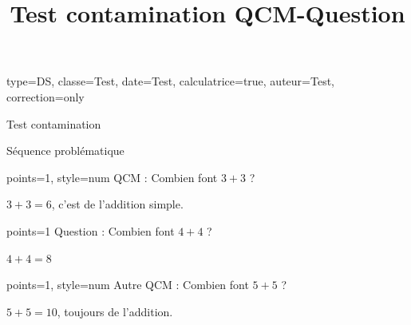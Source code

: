 \documentclass{nfdevoirs}
\title{Test contamination QCM-Question}
\begin{document}
\begin{devoir}{
    type=DS,
    classe={Test},
    date={Test},
    calculatrice=true,
    auteur={Test},
    correction=only
}

\begin{partie}{Test contamination}

    \begin{exercice}{Séquence problématique}

        \begin{qcm}{points=1, style=num}
            QCM : Combien font $3+3$ ?
            \begin{choix}
            \end{choix}
        \end{qcm}

        \begin{correction}
            $3+3 = 6$, c'est de l'addition simple.
        \end{correction}

        \begin{question}{points=1}
            Question : Combien font $4+4$ ?
        \end{question}

        \begin{correction}
            $4+4 = 8$
        \end{correction}

        \begin{qcm}{points=1, style=num}
            Autre QCM : Combien font $5+5$ ?
            \begin{choix}
            \end{choix}
        \end{qcm}

        \begin{correction}
            $5+5 = 10$, toujours de l'addition.
        \end{correction}

    \end{exercice}

\end{partie}

\end{devoir}
\end{document}
